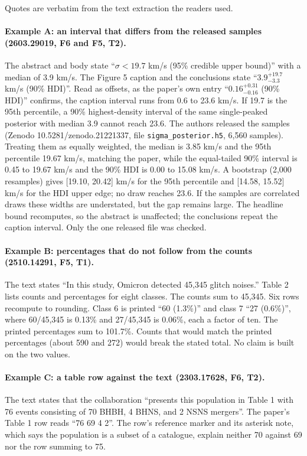 \documentclass[reprint,amsmath,amssymb,aps,superscriptaddress,nofootinbib]{revtex4-2}
\begin{document}
Quotes are verbatim from the text extraction the readers used.

\paragraph*{Example A: an interval that differs from the released samples (2603.29019, F6 and F5, T2).} The abstract and body state ``$\sigma < 19.7$ km/s (95\% credible upper bound)'' with a median of 3.9 km/s. The Figure 5 caption and the conclusions state ``$3.9^{+19.7}_{-3.3}$ km/s (90\% HDI)''. Read as offsets, as the paper's own entry ``$0.16^{+0.31}_{-0.16}$ (90\% HDI)'' confirms, the caption interval runs from 0.6 to 23.6 km/s. If 19.7 is the 95th percentile, a 90\% highest-density interval of the same single-peaked posterior with median 3.9 cannot reach 23.6. The authors released the samples (Zenodo 10.5281/zenodo.21221337, file \texttt{sigma\_posterior.h5}, 6,560 samples). Treating them as equally weighted, the median is 3.85 km/s and the 95th percentile 19.67 km/s, matching the paper, while the equal-tailed 90\% interval is 0.45 to 19.67 km/s and the 90\% HDI is 0.00 to 15.08 km/s. A bootstrap (2,000 resamples) gives [19.10, 20.42] km/s for the 95th percentile and [14.58, 15.52] km/s for the HDI upper edge; no draw reaches 23.6. If the samples are correlated draws these widths are understated, but the gap remains large. The headline bound recomputes, so the abstract is unaffected; the conclusions repeat the caption interval. Only the one released file was checked.

\paragraph*{Example B: percentages that do not follow from the counts (2510.14291, F5, T1).} The text states ``In this study, Omicron detected 45,345 glitch noises.'' Table 2 lists counts and percentages for eight classes. The counts sum to 45,345. Six rows recompute to rounding. Class 6 is printed ``60 (1.3\%)'' and class 7 ``27 (0.6\%)'', where 60/45,345 is 0.13\% and 27/45,345 is 0.06\%, each a factor of ten. The printed percentages sum to 101.7\%. Counts that would match the printed percentages (about 590 and 272) would break the stated total. No claim is built on the two values.

\paragraph*{Example C: a table row against the text (2303.17628, F6, T2).} The text states that the collaboration ``presents this population in Table 1 with 76 events consisting of 70 BHBH, 4 BHNS, and 2 NSNS mergers''. The paper's Table 1 row reads ``76 69 4 2''. The row's reference marker and its asterisk note, which says the population is a subset of a catalogue, explain neither 70 against 69 nor the row summing to 75.
\end{document}
